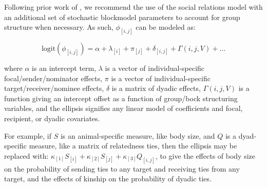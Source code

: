 \documentclass[Afour,sageh,times]{sagej}
\begin{document}
Following prior work of \citet{redhead2021reliable, ross2022modelling}, we recommend the use of the social relations model \citep{kenny1984social, snijders1999social, back2010social} with an additional set of stochastic blockmodel parameters \citep{holland1983stochastic, karrer2011stochastic, peixoto2019bayesian} to account for group structure when necessary. As such, $\phi_{[i,j]}$ can be modeled as:
\begin{ceqn}
\begin{equation}\label{link}
\text{logit}(\phi_{[i,j]}) = \alpha + \lambda_{[i]} + \pi_{[j]} + \delta_{[i,j]} + \Gamma(i,j,V) + \ldots 
\end{equation}
\end{ceqn}
where $\alpha$ is an intercept term, $\lambda$ is a vector of individual-specific focal/sender/nominator effects, $\pi$ is a vector of individual-specific target/receiver/nominee effects, $\delta$ is a matrix of dyadic effects, $\Gamma(i,j,V)$ is a function giving an intercept offset as a function of group/bock structuring variables, and the ellipsis signifies any linear model of coefficients and focal, recipient, or dyadic covariates. 

For example, if $S$ is an animal-specific measure, like body size, and $Q$ is a dyad-specific measure, like a matrix of relatedness ties, then the ellipsis  may be replaced with:  $\kappa_{[1]}S_{[i]} + \kappa_{[2]}S_{[j]} + \kappa_{[3]}Q_{[i,j]}$, to give the effects of body size on the probability of sending ties to any target and receiving ties from any target, and the effects of kinship on the probability of dyadic ties.

\end{document}
